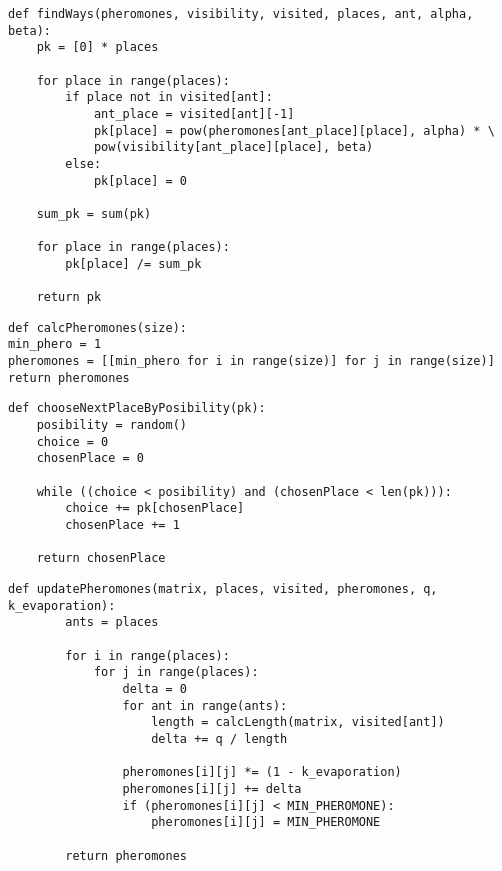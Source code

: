 \clearpage


\begin{center}
	\captionsetup{justification=raggedright,singlelinecheck=off}
	\begin{lstlisting}[label=lst:prob_arr,caption=Реализация алгоритма нахождения массива вероятностей переходов в непосещенные города]
def findWays(pheromones, visibility, visited, places, ant, alpha, beta):
	pk = [0] * places
	
	for place in range(places):
		if place not in visited[ant]:
			ant_place = visited[ant][-1]
			pk[place] = pow(pheromones[ant_place][place], alpha) * \
			pow(visibility[ant_place][place], beta)
		else:
			pk[place] = 0
	
	sum_pk = sum(pk)
	
	for place in range(places):
		pk[place] /= sum_pk
	
	return pk
	\end{lstlisting}
\end{center}

\begin{center}
	\captionsetup{justification=raggedright,singlelinecheck=off}
	\begin{lstlisting}[label=lst:pheromone_above_Zero,caption=Реализация алгоритма нахождения массива вероятностей переходов в непосещенные города]
def calcPheromones(size):
min_phero = 1
pheromones = [[min_phero for i in range(size)] for j in range(size)]
return pheromones
	\end{lstlisting}
\end{center}


\clearpage

\begin{center}
	\captionsetup{justification=raggedright,singlelinecheck=off}
	\begin{lstlisting}[label=lst:choose_next,caption=Реализация алгоритма выбора следующего города]
def chooseNextPlaceByPosibility(pk):
	posibility = random()
	choice = 0
	chosenPlace = 0
	
	while ((choice < posibility) and (chosenPlace < len(pk))):
		choice += pk[chosenPlace]
		chosenPlace += 1
	
	return chosenPlace
	\end{lstlisting}
\end{center}


\begin{center}
	\captionsetup{justification=raggedright,singlelinecheck=off}
	\begin{lstlisting}[label=lst:upd_pher,caption=Реализация алгоритма обновления матрицы феромонов]
	def updatePheromones(matrix, places, visited, pheromones, q, k_evaporation):
		ants = places
		
		for i in range(places):
			for j in range(places):
				delta = 0
				for ant in range(ants):
					length = calcLength(matrix, visited[ant])
					delta += q / length
				
				pheromones[i][j] *= (1 - k_evaporation)
				pheromones[i][j] += delta
				if (pheromones[i][j] < MIN_PHEROMONE):
					pheromones[i][j] = MIN_PHEROMONE
		
		return pheromones
	\end{lstlisting}
\end{center}


